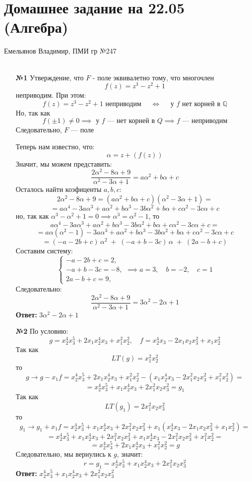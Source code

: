 \documentclass[a4paper]{article}
\renewcommand{\f}[2]{\frac{#1}{#2}}
\newcommand{\lr}{\Leftrightarrow}
\newcommand{\QQ}{\mathbb{Q}}
\begin{document}
\section*{Домашнее задание на 22.05 (Алгебра)}
{\large Емельянов Владимир, ПМИ гр №247}\\\\
\begin{enumerate}
  \item[\textbf{№1}]Утверждение, что $F$ - поле эквивалетно тому, что многочлен
  $$f(z) = z^3 -z^2 + 1$$
  неприводим. При этом:
  $$f(z) = z^3 -z^2 + 1\text{ неприводим } \quad \lr \quad \text{ у $f$ нет корней в $\QQ$}$$
  Но, так как $$f(\pm 1) \neq 0 \implies \text{ у $f$ --- нет корней в $Q$} \implies f \text{ --- неприводим}$$
  Следовательно, $F$ --- поле

  Теперь нам известно, что:
  $$\alpha = z + (f(z))$$
  Значит, мы можем представить:
  $$\f{2\alpha^2 - 8\alpha + 9}{\alpha^2 -3\alpha + 1} = a\alpha^2 + b\alpha + c$$
  Осталось найти коэфиценты $a, b, c$:
  $$2\alpha^2 - 8\alpha + 9= (a\alpha^2 + b\alpha + c)(\alpha^2 -3\alpha + 1)=$$
  $$
  = a\alpha^4 -3a\alpha^3 + a\alpha^2
  + b\alpha^3 -3b\alpha^2 + b\alpha
  + c\alpha^2 -3c\alpha + c
  $$
  но, так как $\alpha^3 -\alpha^2 + 1 = 0 \implies \alpha^3 = \alpha^2 - 1$, то
  $$a\alpha^4 -3a\alpha^3 + a\alpha^2
  + b\alpha^3 -3b\alpha^2 + b\alpha
  + c\alpha^2 -3c\alpha + c =$$
  $$=a\alpha(\alpha^2 - 1) -3a\alpha^3 + a\alpha^2
  + b\alpha^3 -3b\alpha^2 + b\alpha
  + c\alpha^2 -3c\alpha + c $$
  $$= (-a-2b+c)\,\alpha^2\;+\;(-a+b-3c)\,\alpha\;+\;(2a - b + c)$$
  Составим систему:
  $$
  \begin{cases}
  -a-2b+c=2,\\
  -a+b-3c=-8,\\
  2a - b + c=9,
  \end{cases}
  \implies a=3,\quad b=-2,\quad c=1$$
  Следовательно:
  $$\f{2\alpha^2 - 8\alpha + 9}{\alpha^2 -3\alpha + 1} = 3\alpha^2 -2\alpha + 1$$
  \textbf{Ответ: } $3\alpha^2 -2\alpha + 1$

  \item[\textbf{№2}]
  По условию:
  $$g = x_2^4x_3^5 + 2x_1x_2^4x_3 + x_1^2x_2^2, \quad f = x_2^4x_3 - 2x_1x_2x_3^2 + x_1x_2^2$$
  Так как
  $$LT(g) = x_1^2 x_2^2$$
  то 
  $$g \to g-x_1f = x_2^4x_3^5 + 2x_1x_2^4x_3 + x_1^2x_2^2 - (x_1x_2^4x_3 - 2x_1^2x_2x_3^2 + x_1^2x_2^2) = $$
  $$=x_2^4x_3^5 + x_1x_2^4x_3 + 2x_1^2x_2x_3^2 = g_1 $$
  Так как 
  $$LT(g_1) = 2x_1^2x_2x_3^2$$
  то
  $$g_1 \to g_1 + x_1f = x_2^4x_3^5 + x_1x_2^4x_3 + 2x_1^2x_2x_3^2  + x_1(x_2^4x_3 - 2x_1x_2x_3^2 + x_1x_2^2) = $$
  $$=x_2^4x_3^5 + x_1x_2^4x_3 + 2x_1^2x_2x_3^2  + x_1x_2^4x_3 - 2x_1^2x_2x_3^2 + x_1^2x_2^2 = $$
  $$ = x_2^4x_3^5 + 2x_1x_2^4x_3 + x_1^2x_2^2 = g$$
  Следовательно, мы вернулись к $g$, значит:
  $$r = g_1 = x_2^4x_3^5 + x_1x_2^4x_3 + 2x_1^2x_2x_3^2$$
  \textbf{Ответ: } $x_2^4x_3^5 + x_1x_2^4x_3 + 2x_1^2x_2x_3^2$\\


\end{enumerate}
\end{document}
